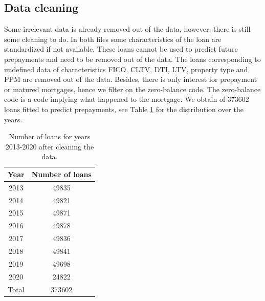 \subsection{Data cleaning}
	Some irrelevant data is already removed out of the data, however, there is still some cleaning to do. In both files some characteristics of the loan are standardized if not available. These loans cannot be used to predict future prepayments and need to be removed out of the data. The loans corresponding to undefined data of characteristics FICO, CLTV, DTI, LTV, property type and PPM are removed out of the data. Besides, there is only interest for prepayment or matured mortgages, hence we filter on the zero-balance code. The zero-balance code is a code implying what happened to the mortgage. We obtain of 373602 loans fitted to predict prepayments, see Table \ref{model_cleaned data_table} for the distribution over the years. 
    \begin{table}[H]
        \centering
        \begin{tabular}{c|c}
            Year & Number of loans \\\hline
            2013 & 49835 \\
            2014 & 49821 \\
            2015 & 49871 \\
            2016 & 49878 \\
            2017 & 49836 \\
            2018 & 49841 \\
            2019 & 49698 \\
            2020 & 24822 \\\hline
            Total & 373602 
		\end{tabular}
		\caption{Number of loans for years 2013-2020 after cleaning the data.}
		\label{model_cleaned data_table}
    \end{table}
    
